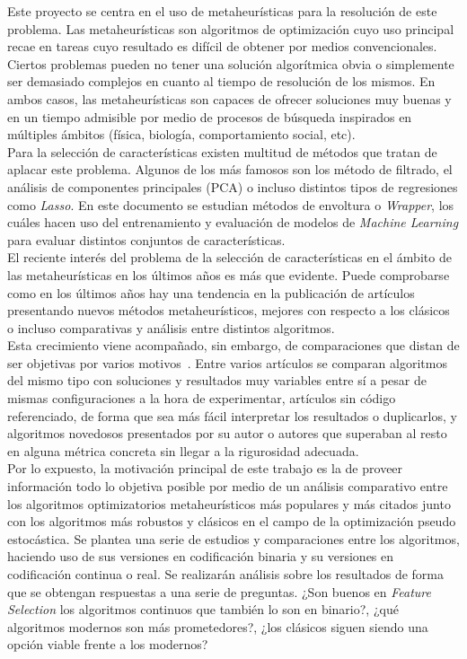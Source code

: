 Este proyecto se centra en el uso de metaheurísticas para la resolución de este problema. Las metaheurísticas son algoritmos de optimización cuyo uso principal recae en tareas cuyo resultado es difícil de obtener por medios convencionales. Ciertos problemas pueden no tener una solución algorítmica obvia o simplemente ser demasiado complejos en cuanto al tiempo de resolución de los mismos. En ambos casos, las metaheurísticas son capaces de ofrecer soluciones muy buenas y en un tiempo admisible por medio de procesos de búsqueda inspirados en múltiples ámbitos (física, biología, comportamiento social, etc). \\[6pt]
Para la selección de características existen multitud de métodos que tratan de aplacar este problema. Algunos de los más famosos son los método de filtrado, el análisis de componentes principales (PCA) o incluso distintos tipos de regresiones como \textit{Lasso}. En este documento se estudian métodos de envoltura o \textit{Wrapper}, los cuáles hacen uso del entrenamiento y evaluación de modelos de \textit{Machine Learning} para evaluar distintos conjuntos de características. \\[6pt]
El reciente interés del problema de la selección de características en el ámbito de las
metaheurísticas en los últimos años es más que evidente. Puede comprobarse como en los
últimos años hay una tendencia en la publicación de artículos presentando nuevos métodos
metaheurísticos, mejores con respecto a los clásicos o incluso comparativas y análisis entre
distintos algoritmos.\\[6pt]

Esta crecimiento viene acompañado, sin embargo, de comparaciones que distan de ser objetivas
por varios motivos~\cite{molina_comprehensive_2020}. Entre varios artículos se comparan algoritmos del mismo tipo con
soluciones y resultados muy variables entre sí a pesar de mismas configuraciones a la hora
de experimentar, artículos sin código referenciado, de forma que sea más fácil interpretar
los resultados o duplicarlos, y algoritmos novedosos presentados por su autor o autores que
superaban al resto en alguna métrica concreta sin llegar a la rigurosidad adecuada.\\[6pt]

Por lo expuesto, la motivación principal de este trabajo es la de proveer información todo lo objetiva posible por medio de un análisis comparativo entre los
algoritmos optimizatorios metaheurísticos más populares y más citados junto con los
algoritmos más robustos y clásicos en el campo de la optimización pseudo estocástica. Se plantea una serie de estudios y comparaciones entre los algoritmos, haciendo uso de sus versiones en codificación binaria y su versiones en codificación continua o real. Se realizarán análisis sobre los resultados de forma que se obtengan respuestas a una serie de preguntas. ¿Son buenos en \textit{Feature Selection} los algoritmos continuos que también lo son en binario?, ¿qué algoritmos modernos son más prometedores?, ¿los clásicos siguen siendo una opción viable frente a los modernos?

